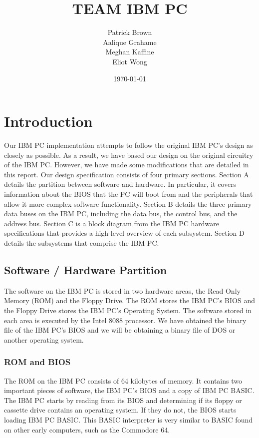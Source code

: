 \documentclass[12pt, letterpaper]{article}
\title{TEAM IBM PC}
\author{Patrick Brown\\
    Aalique Grahame\\
    Meghan Kaffine\\
    Eliot Wong}
\date{\today}
\begin{document}
\vfill
\maketitle
\clearpage

\tableofcontents
\clearpage

\section{Introduction}

    Our IBM PC implementation attempts to follow the original IBM PC’s design as closely as possible. As a result, we have based our design on the original circuitry of the IBM PC. However, we have made some modifications that are detailed in this report. Our design specification consists of four primary sections. Section A details the partition between software and hardware. In particular, it covers information about the BIOS that the PC will boot from and the peripherals that allow it more complex software functionality. Section B details the three primary data buses on the IBM PC, including the data bus, the control bus, and the address bus. Section C is a block diagram from the IBM PC hardware specifications that provides a high-level overview of each subsystem. Section D details the subsystems that comprise the IBM PC. 

\subsection{Software / Hardware Partition}

The software on the IBM PC is stored in two hardware areas, the Read Only Memory (ROM) and the Floppy Drive. The ROM stores the IBM PC’s BIOS and the Floppy Drive stores the IBM PC’s Operating System. The software stored in each area is executed by the Intel 8088 processor. We have obtained the binary file of the IBM PC’s BIOS and we will be obtaining a binary file of DOS or another operating system. 

\subsubsection{ROM and BIOS}

    The ROM on the IBM PC consists of 64 kilobytes of memory. It contains two important pieces of software, the IBM PC’s BIOS and a copy of IBM PC BASIC. The IBM PC starts by reading from its BIOS and determining if its floppy or cassette drive contains an operating system. If they do not, the BIOS starts loading IBM PC BASIC. This BASIC interpreter is very similar to BASIC found on other early computers, such as the Commodore 64. 
        
\end{document}
